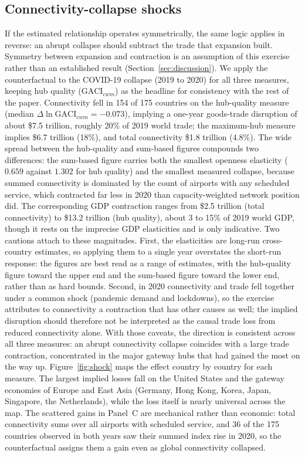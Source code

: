 \subsection{Connectivity-collapse shocks}
If the estimated relationship operates symmetrically, the same logic applies in
reverse: an abrupt collapse should subtract the trade that expansion built.
Symmetry between expansion and contraction is an assumption of this exercise
rather than an established result (Section~\ref{sec:discussion}). We apply the
counterfactual to the COVID-19 collapse (2019 to 2020) for all three measures,
keeping hub quality ($\mathrm{GACI}_{cwm}$) as the headline for consistency with the
rest of the paper. Connectivity fell in 154 of 175 countries on the hub-quality
measure (median $\Delta\ln\mathrm{GACI}_{cwm}=-0.073$), implying a one-year
goods-trade disruption of about \$7.5 trillion, roughly 20\% of 2019 world trade; the
maximum-hub measure implies \$6.7 trillion (18\%), and total connectivity
\$1.8 trillion (4.8\%). The wide spread between the hub-quality and
sum-based figures compounds two differences: the sum-based figure carries
both the smallest openness elasticity ($0.659$ against $1.302$ for hub
quality) and the smallest measured collapse, because summed connectivity is
dominated by the count of airports with any scheduled service, which
contracted far less in 2020 than capacity-weighted network position did.
The corresponding GDP contraction ranges from \$2.5 trillion
(total connectivity) to \$13.2 trillion (hub quality), about 3 to 15\% of 2019 world
GDP, though it rests on the imprecise GDP elasticities and is only indicative. Two
cautions attach to these magnitudes. First, the
elasticities are long-run cross-country estimates, so applying them to a single year
overstates the short-run response: the figures are best read as a range of
estimates, with the hub-quality figure toward the upper end and the sum-based
figure toward the lower end, rather than as hard bounds.
Second, in 2020 connectivity and trade fell together under a common shock (pandemic
demand and lockdowns), so the exercise attributes to connectivity a contraction that
has other causes as well; the implied disruption should therefore not be
interpreted as the causal trade loss from reduced connectivity alone. With those
caveats, the direction is consistent across all three measures: an abrupt
connectivity collapse coincides with a large trade contraction, concentrated in
the major gateway hubs that had gained the most on the way up. Figure~\ref{fig:shock} maps the effect country by
country for each measure. The largest implied losses fall on the United States and
the gateway economies of Europe and East Asia (Germany, Hong Kong, Korea, Japan,
Singapore, the Netherlands), while the loss itself is nearly universal across the
map. The scattered gains in Panel~C are mechanical rather than economic: total
connectivity sums over all airports with scheduled service, and 36 of the 175
countries observed in both years saw their summed index rise in 2020, so the
counterfactual assigns them a gain even as global connectivity collapsed.

